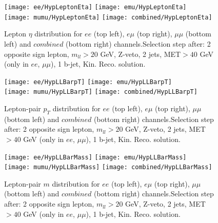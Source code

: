\clearpage
\newpage


\begin{figure}
  \texttt{[image: ee/HypLeptonEta]}
  \texttt{[image: emu/HypLeptonEta]}\\
  \texttt{[image: mumu/HypLeptonEta]}
  \texttt{[image: combined/HypLeptonEta]}
\caption{Lepton $\eta$ distribution for $ee$ (top left), $e\mu$ (top right), $\mu\mu$ (bottom left) and $combined$ (bottom right) channels.\newline Selection step after: 2 opposite sign lepton, $m_{ll}>20$ GeV, Z-veto, 2 jets, MET$>40$ GeV (only in $ee$, $\mu\mu$), 1 b-jet, Kin. Reco. solution.}
\end{figure}

\clearpage
\newpage


\begin{figure}
  \texttt{[image: ee/HypLLBarpT]}
  \texttt{[image: emu/HypLLBarpT]}\\
  \texttt{[image: mumu/HypLLBarpT]}
  \texttt{[image: combined/HypLLBarpT]}
\caption{Lepton-pair $p_T$ distribution for $ee$ (top left), $e\mu$ (top right), $\mu\mu$ (bottom left) and $combined$ (bottom right) channels.\newline Selection step after: 2 opposite sign lepton, $m_{ll}>20$ GeV, Z-veto, 2 jets, MET$>40$ GeV (only in $ee$, $\mu\mu$), 1 b-jet, Kin. Reco. solution.}
\end{figure}

\clearpage
\newpage


\begin{figure}
  \texttt{[image: ee/HypLLBarMass]}
  \texttt{[image: emu/HypLLBarMass]}\\
  \texttt{[image: mumu/HypLLBarMass]}
  \texttt{[image: combined/HypLLBarMass]}
\caption{Lepton-pair $m$ distribution for $ee$ (top left), $e\mu$ (top right), $\mu\mu$ (bottom left) and $combined$ (bottom right) channels.\newline Selection step after: 2 opposite sign lepton, $m_{ll}>20$ GeV, Z-veto, 2 jets, MET$>40$ GeV (only in $ee$, $\mu\mu$), 1 b-jet, Kin. Reco. solution.}
\end{figure}

